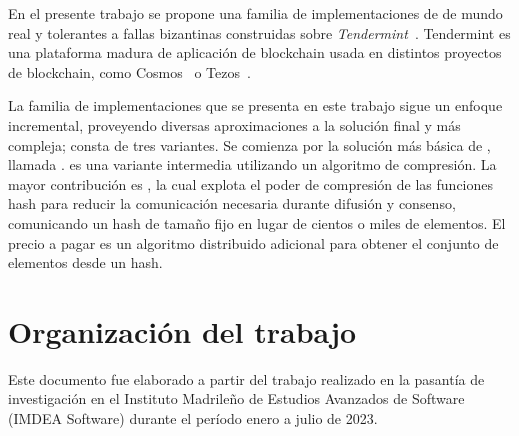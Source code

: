   En el presente trabajo se propone una familia de implementaciones de \setchain 
  de mundo real y tolerantes a fallas bizantinas construidas sobre \textit{Tendermint}~\cite{Buchman.2018.Tendermint}.
  Tendermint es una plataforma madura de aplicación de blockchain usada en distintos
  proyectos de blockchain, como Cosmos~\cite{cosmos} o Tezos~\cite{goodman14tezos}. 
  
  La familia de implementaciones que se presenta en este trabajo sigue un enfoque
  incremental, proveyendo diversas aproximaciones a la solución final y más compleja;
  consta de tres variantes.
  Se comienza por la solución más básica de \setchain, llamada \vanilla.
  \compresschain es una variante intermedia utilizando un algoritmo de compresión.
  La mayor contribución es \hashchain, la cual explota el poder de compresión de las
  funciones hash para reducir la comunicación necesaria durante difusión y consenso,
  comunicando un hash de tamaño fijo en lugar de cientos o miles de elementos.
  El precio a pagar es un algoritmo distribuido adicional para obtener el conjunto de
  elementos desde un hash.


  \section{Organización del trabajo}
  Este documento fue elaborado a partir del trabajo realizado en la pasantía de investigación
  en el Instituto Madrileño de Estudios Avanzados de Software (IMDEA Software) durante el período
  enero a julio de 2023.

